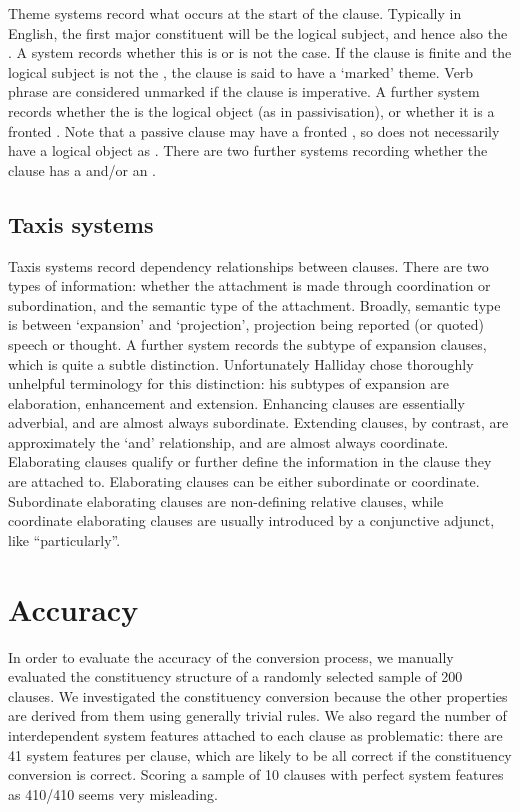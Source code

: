 \documentclass[11pt]{article}
\begin{document}
Theme systems record what occurs at the start of the clause. Typically in English, the first major constituent will be the logical subject, and hence also the . A system records whether this is or is not the case. If the clause is finite and the logical subject is not the , the clause is said to have a `marked' theme. Verb phrase  are considered unmarked if the clause is imperative. A further system records whether the  is the logical object (as in passivisation), or whether it is a fronted . Note that a passive clause may have a fronted , so does not necessarily have a logical object as . There are two further systems recording whether the clause has a  and/or an .

\subsection{Taxis systems}

Taxis systems record dependency relationships between clauses. There are two types of information: whether the attachment is made through coordination or subordination, and the semantic type of the attachment. Broadly, semantic type is between `expansion' and `projection', projection being reported (or quoted) speech or thought. A further system records the subtype of expansion clauses, which is quite a subtle distinction. Unfortunately Halliday chose thoroughly unhelpful terminology for this distinction: his subtypes of expansion are elaboration, enhancement and extension. Enhancing clauses are essentially adverbial, and are almost always subordinate. Extending clauses, by contrast, are approximately the `and' relationship, and are almost always coordinate. Elaborating clauses qualify or further define the information in the clause they are attached to. Elaborating clauses can be either subordinate or coordinate. Subordinate elaborating clauses are non-defining relative clauses, while coordinate elaborating clauses are usually introduced by a conjunctive adjunct, like ``particularly''.

\section{Accuracy}

In order to evaluate the accuracy of the conversion process, we manually evaluated the constituency structure of a randomly selected sample of 200 clauses. We investigated the constituency conversion because the other properties are derived from them using generally trivial rules. We also regard the number of interdependent system features attached to each clause as problematic: there are 41 system features per clause, which are likely to be all correct if the constituency conversion is correct. Scoring a sample of 10 clauses with perfect system features as 410/410 seems very misleading.
\end{document}
